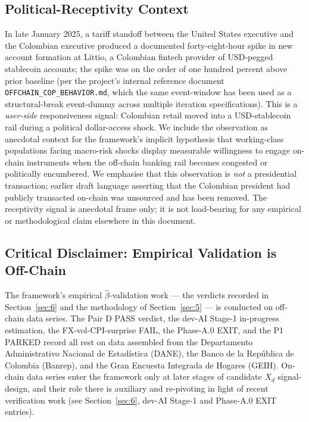 \subsection{Political-Receptivity Context}\label{sec:4-receptivity}

In late January 2025, a tariff standoff between the United States executive
and the Colombian executive produced a documented forty-eight-hour spike in
new account formation at Littio, a Colombian fintech provider of USD-pegged
stablecoin accounts; the spike was on the order of one hundred percent above
prior baseline (per the project's internal reference document
\texttt{OFFCHAIN\_COP\_BEHAVIOR.md}, which the same event-window has been used
as a structural-break event-dummy across multiple iteration specifications).
This is a \emph{user-side} responsiveness signal: Colombian retail moved into
a USD-stablecoin rail during a political dollar-access shock. We include the
observation as anecdotal context for the framework's implicit hypothesis that
working-class populations facing macro-risk shocks display measurable
willingness to engage on-chain instruments when the off-chain banking rail
becomes congested or politically encumbered. We emphasise that this
observation is \emph{not} a presidential transaction; earlier draft language
asserting that the Colombian president had publicly transacted on-chain was
unsourced and has been removed. The receptivity signal is anecdotal frame
only; it is not load-bearing for any empirical or methodological claim
elsewhere in this document.

\subsection{Critical Disclaimer: Empirical Validation is Off-Chain}\label{sec:4-disclaimer}

The framework's empirical \(\hat{\beta}\)-validation work --- the verdicts
recorded in Section~\ref{sec:6} and the methodology of Section~\ref{sec:5} ---
is conducted on off-chain data series. The Pair D PASS verdict, the
dev-AI Stage-1 in-progress estimation, the FX-vol-CPI-surprise FAIL, the
Phase-A.0 EXIT, and the P1 PARKED record all rest on data assembled from the
Departamento Administrativo Nacional de Estad\'istica (DANE), the Banco de la
Rep\'ublica de Colombia (Banrep), and the Gran Encuesta Integrada de Hogares
(GEIH). On-chain data series enter the framework only at later stages of
candidate \(X_d\) signal-design, and their role there is auxiliary and
re-pivoting in light of recent verification work
(see Section~\ref{sec:6}, dev-AI Stage-1 and Phase-A.0 EXIT entries).

